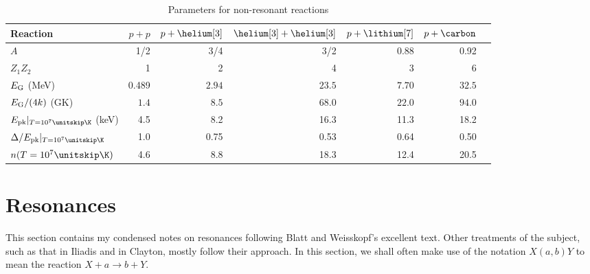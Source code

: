 \begin{table}[htbp]
\caption{\label{t.reaction} Parameters for non-resonant reactions}
\begin{center}
\begin{tabular}{lrrrrrr}
\hline
Reaction & $p+p$ & $p+\helium[3]$ & $\helium[3]+\helium[3]$ & $p+\lithium[7]$ & $p+\carbon$\\
\hline\hline
$A$ & 1/2 & 3/4 & 3/2 & 0.88 & 0.92 \\
$Z_{1}Z_{2}$ & 1 & 2 & 4 & 3 & 6 \\
$E_{\mathrm{G}}$ (MeV) & 0.489 & $2.94$ & $23.5$ & $7.70$ & $32.5$\\
$E_{\mathrm{G}}/(4k)$ (GK) & $1.4$ & $8.5$ & $68.0$ & $22.0$ & $94.0$ \\
$\Epk|_{T=10^{7}\nsp\K}$ (keV) & 4.5 & 8.2 & 16.3 & 11.3 & 18.2\\
$\Delta/\Epk|_{T=10^{7}\nsp\K}$ & 1.0 & 0.75 & 0.53 & 0.64 & 0.50 \\
$n(T = 10^{7}\nsp\K)$ & 4.6 & 8.8 & 18.3 & 12.4 & 20.5\\
\hline
\end{tabular}
\end{center}
\end{table}
%

\section{Resonances}\label{s.resonant-reactions}

This section contains my condensed notes on resonances following Blatt and Weisskopf's excellent text\cite{Blatt1979Theoretical-Nuc}.  Other treatments of the subject, such as that in Iliadis\cite{Iliadis2007Nuclear-Physics} and in Clayton\cite{Clayton1983Principles-of-S}, mostly follow their approach. In this section, we shall often make use of the notation $X(a,b)Y$ to mean the reaction $X + a \to b + Y$.

